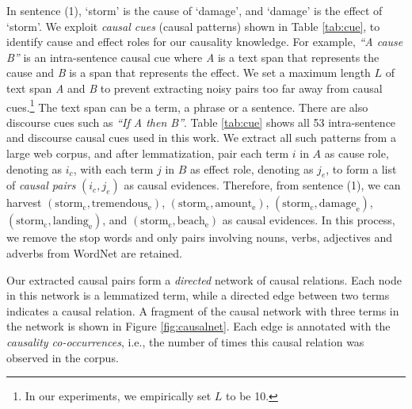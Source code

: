 \documentclass[letterpaper]{article}
\newcommand{\tabref}[1]{Table \ref{#1}}
\newcommand{\figref}[1]{Figure \ref{#1}}
\begin{document}
In sentence (1),
`storm' is the cause of `damage', and `damage' is the effect of `storm'.
We exploit {\em causal cues} (causal patterns) shown in \tabref{tab:cue},
to identify cause and effect roles for our causality knowledge.
For example, \textit{``A cause B''} is an intra-sentence causal
cue where \textit{A} is a text span that represents the cause
and \textit{B} is a span that represents the effect.
We set a maximum length $L$
of text span \textit{A} and \textit{B} to prevent
extracting noisy pairs too far away from causal cues.\footnote{In our
experiments, we empirically set $L$ to be 10.}
The text span can be a term, a phrase or a sentence.
There are also discourse cues such as \textit{``If A then B''}.
\tabref{tab:cue} shows all 53 intra-sentence and discourse
causal cues used in this work.
We extract all such patterns from a large web corpus, and after lemmatization,
pair each term $i$ in $A$ as cause role, denoting as $i_c$, with each term $j$
in $B$ as effect role, denoting as $j_e$, to form a list of
\textit{causal pairs} $(i_c,j_e)$ as causal evidences.
Therefore, from sentence (1), we can harvest
$(\text{storm}_{\text{c}}, \text{tremendous}_{\text{e}})$,
$(\text{storm}_{\text{c}}, \text{amount}_{\text{e}})$,
$(\text{storm}_{\text{c}}, \text{damage}_{\text{e}})$,
$(\text{storm}_{\text{c}}, \text{landing}_{\text{e}})$,
and $(\text{storm}_{\text{c}}, \text{beach}_{\text{e}})$
as causal evidences.
In this process, we remove the stop words and only pairs involving nouns, verbs,
adjectives and adverbs from WordNet are retained.

Our extracted causal pairs form a {\em directed} network of causal relations.
Each node in this network is a lemmatized term,
while a directed edge between two terms indicates a causal relation.
A fragment of the causal network with three terms in the network is
shown in \figref{fig:causalnet}.
Each edge is annotated with the {\em causality co-occurrences}, i.e.,
the number of times this causal relation was observed in the corpus.
\end{document}
